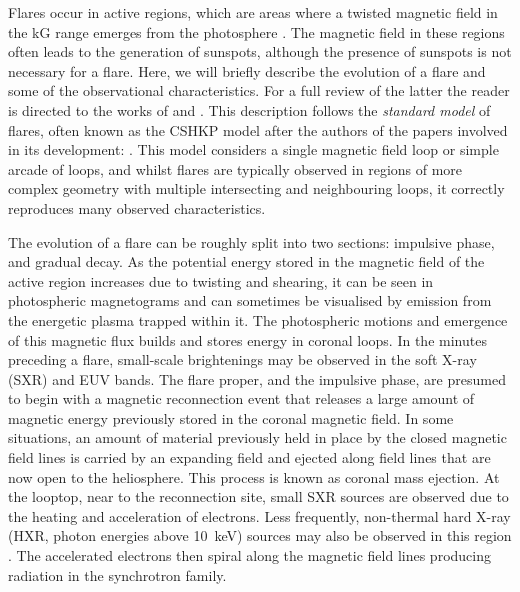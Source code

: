 Flares occur in active regions, which are areas where a twisted magnetic field in the kG range emerges from the photosphere \citep[for a review of active region evolution see][]{VanDriel-Gesztelyi2015}.
The magnetic field in these regions often leads to the generation of sunspots, although the presence of sunspots is not necessary for a flare.
Here, we will briefly describe the evolution of a flare and some of the observational characteristics.
For a full review of the latter the reader is directed to the works of \citet{Benz2008} and \citet{Fletcher2011}.
This description follows the \emph{standard model} of flares, often known as the CSHKP model after the authors of the papers involved in its development: \citet{Carmichael1964,Sturrock1966,Hirayama1974,Kopp1976}.
This model considers a single magnetic field loop or simple arcade of loops, and whilst flares are typically observed in regions of more complex geometry with multiple intersecting and neighbouring loops, it correctly reproduces many observed characteristics.

The evolution of a flare can be roughly split into two sections: impulsive phase, and gradual decay.
As the potential energy stored in the magnetic field of the active region increases due to twisting and shearing, it can be seen in photospheric magnetograms and can sometimes be visualised by emission from the energetic plasma trapped within it.
The photospheric motions and emergence of this magnetic flux builds and stores energy in coronal loops.
In the minutes preceding a flare, small-scale brightenings may be observed in the soft X-ray (SXR) and EUV bands.
The flare proper, and the impulsive phase, are presumed to begin with a magnetic reconnection event that releases a large amount of magnetic energy previously stored in the coronal magnetic field.
In some situations, an amount of material previously held in place by the closed magnetic field lines is carried by an expanding field and ejected along field lines that are now open to the heliosphere.
This process is known as coronal mass ejection.
At the looptop, near to the reconnection site, small SXR sources are observed due to the heating and acceleration of electrons.
Less frequently, non-thermal hard X-ray (HXR, photon energies above \SI{10}{\kilo\electronvolt}) sources may also be observed in this region \citep{Krucker2008}.
The accelerated electrons then spiral along the magnetic field lines producing radiation in the synchrotron family.


